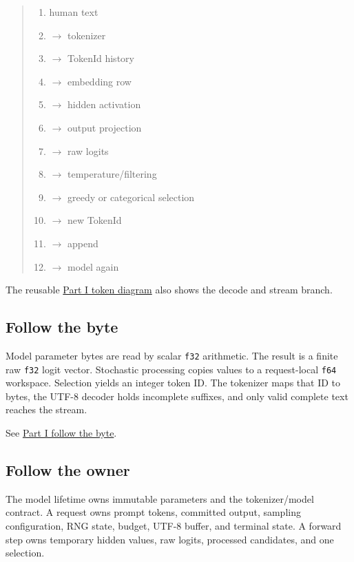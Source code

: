 \begin{quote}
\begin{enumerate}
\item human text
\item \(\longrightarrow\)  tokenizer
\item \(\longrightarrow\)  TokenId history
\item \(\longrightarrow\)  embedding row
\item \(\longrightarrow\)  hidden activation
\item \(\longrightarrow\)  output projection
\item \(\longrightarrow\)  raw logits
\item \(\longrightarrow\)  temperature/filtering
\item \(\longrightarrow\)  greedy or categorical selection
\item \(\longrightarrow\)  new TokenId
\item \(\longrightarrow\)  append
\item \(\longrightarrow\)  model again
\end{enumerate}
\end{quote}

The reusable
\href{https://github.com/hermonai/inside-the-llm-engine/blob/astra-visual-rewrite/diagrams/sampling/part1-follow-token.txt}{Part
I token diagram} also shows the decode and stream branch.

\subsection{Follow the byte}\label{follow-the-byte-1}

Model parameter bytes are read by scalar \texttt{f32} arithmetic. The
result is a finite raw \texttt{f32} logit vector. Stochastic processing
copies values to a request-local \texttt{f64} workspace. Selection
yields an integer token ID. The tokenizer maps that ID to bytes, the
UTF-8 decoder holds incomplete suffixes, and only valid complete text
reaches the stream.

See
\href{https://github.com/hermonai/inside-the-llm-engine/blob/astra-visual-rewrite/diagrams/sampling/part1-follow-byte.txt}{Part
I follow the byte}.

\subsection{Follow the owner}\label{follow-the-owner-1}

The model lifetime owns immutable parameters and the tokenizer/model
contract. A request owns prompt tokens, committed output, sampling
configuration, RNG state, budget, UTF-8 buffer, and terminal state. A
forward step owns temporary hidden values, raw logits, processed
candidates, and one selection.

